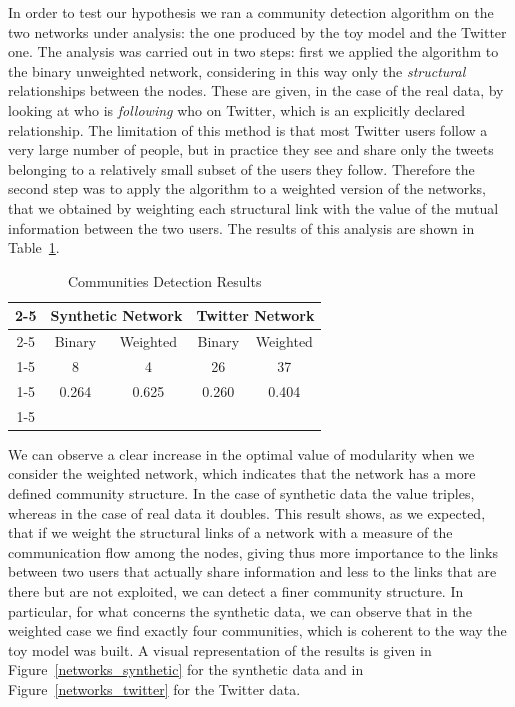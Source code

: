 \documentclass[12pt]{article}
\begin{document}
In order to test our hypothesis we ran a community detection algorithm on the two networks under analysis: the one produced by the toy model and the Twitter one. 
The analysis was carried out in two steps: first we applied the algorithm to the binary unweighted network, considering in this way only the \textit{structural}
relationships between the nodes. These are given, in the case of the real data, by looking at who is \textit{following} who on Twitter, which is an
explicitly declared relationship. The limitation of this method is that most Twitter users follow a very large number of people, but in practice they
see and share only the tweets belonging to a relatively small subset of the users they follow. Therefore the second step was to apply the algorithm 
to a weighted version of the networks, that we obtained by weighting each structural link with the value of the mutual information between the two users.
The results of this analysis are shown in Table~\ref{table_modularity}.

\begin{center}
\begin{table}[!ht]
\caption{Communities Detection Results}
\begin{tabular}{c|c|c|c|c|}
\cline{2-5}
& \multicolumn{2}{|c|}{Synthetic Network} & \multicolumn{2}{|c|}{Twitter Network} \\ \cline{2-5}
& Binary & Weighted & Binary & Weighted \\ \cline{1-5}
\multicolumn{1}{ |c| }{Number of Detected Communities} & 8 & 4 & 26 & 37 \\ \cline{1-5}
\multicolumn{1}{ |c| }{Optimal Modularity Value} & 0.264 & 0.625 & 0.260 & 0.404 \\ \cline{1-5}
\end{tabular}
\label{table_modularity}
\end{table}
\end{center}

We can observe a clear increase in the optimal value of modularity when we consider the weighted network, which indicates that the network has a more
defined community structure. In the case of synthetic data the value triples, whereas in the case of real data it doubles. This result shows, as we expected,
that if we weight the structural links of a network with a measure of the communication flow among the nodes, giving thus more importance to the links
between two users that actually share information and less to the links that are there but are not exploited, we can detect a finer community structure.
In particular, for what concerns the synthetic data, we can observe that in the weighted case we find exactly four communities, which is coherent to the way
the toy model was built. A visual representation of the results is given in Figure~\ref{networks_synthetic} for the synthetic data and in 
Figure~\ref{networks_twitter} for the Twitter data.
\end{document}
